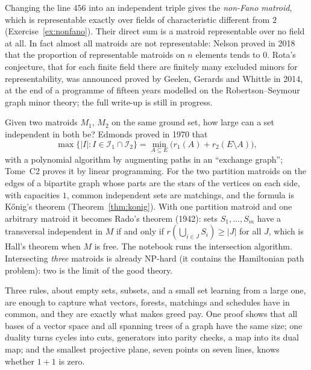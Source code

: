 Changing the line $456$ into an independent triple gives the \emph{non-Fano matroid}, which is representable exactly over fields of characteristic different from $2$ (Exercise~\ref{ex:nonfano}). Their direct sum is a
matroid representable over no field at all. In fact almost all matroids are not representable: Nelson proved in 2018 that the proportion of representable matroids on $n$ elements tends to $0$. Rota's
conjecture, that for each finite field there are finitely many excluded minors for representability, was announced proved by Geelen, Gerards and Whittle in 2014, at the end of a programme of fifteen years
modelled on the Robertson--Seymour graph minor theory; the full write-up is still in progress.

\begin{remark}
Given two matroids $M_1$, $M_2$ on the same ground set, how large can a set independent in both be? Edmonds proved in 1970 that
\[
\max\{|I|:I\in\mathcal I_1\cap\mathcal I_2\}=\min_{A\subseteq E}\bigl(r_1(A)+r_2(E\setminus A)\bigr),
\]
with a polynomial algorithm by augmenting paths in an ``exchange graph''; Tome~C2 proves it by linear programming. For the two partition matroids on the edges of a bipartite graph whose parts are the stars of the
vertices on each side, with capacities $1$, common independent sets are matchings, and the formula is K\H onig's theorem (Theorem~\ref{thm:konig}). With one partition matroid and one arbitrary matroid it becomes
Rado's theorem (1942): sets $S_1,\dots,S_m$ have a transversal independent in $M$ if and only if $r(\bigcup_{i\in J}S_i)\ge|J|$ for all $J$, which is Hall's theorem when $M$ is free. The notebook runs the intersection
algorithm. Intersecting \emph{three} matroids is already NP-hard (it contains the Hamiltonian path problem): two is the limit of the good theory.
\end{remark}

\begin{beauty}
Three rules, about empty sets, subsets, and a small set learning from a large one, are enough to capture what vectors, forests, matchings and schedules have in common, and they are exactly what makes greed
pay. One proof shows that all bases of a vector space and all spanning trees of a graph have the same size; one duality turns cycles into cuts, generators into parity checks, a map into its dual map; and the
smallest projective plane, seven points on seven lines, knows whether $1+1$ is zero.
\end{beauty}


